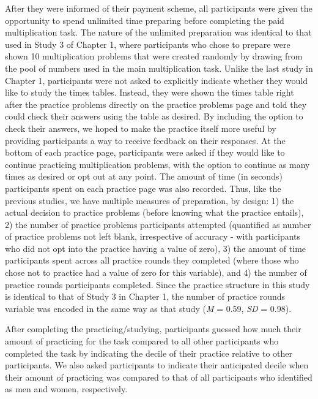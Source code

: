 \documentclass[letterpaper, nobind]{templates/ociamthesis}
\begin{document}
After they were informed of their payment scheme, all participants were given the opportunity to spend unlimited time preparing before completing the paid multiplication task. The nature of the unlimited preparation was identical to that used in Study 3 of Chapter 1, where participants who chose to prepare were shown 10 multiplication problems that were created randomly by drawing from the pool of numbers used in the main multiplication task. Unlike the last study in Chapter 1, participants were not asked to explicitly indicate whether they would like to study the times tables. Instead, they were shown the times table right after the practice problems directly on the practice problems page and told they could check their answers using the table as desired. By including the option to check their answers, we hoped to make the practice itself more useful by providing participants a way to receive feedback on their responses. At the bottom of each practice page, participants were asked if they would like to continue practicing multiplication problems, with the option to continue as many times as desired or opt out at any point. The amount of time (in seconds) participants spent on each practice page was also recorded. Thus, like the previous studies, we have multiple measures of preparation, by design: 1) the actual decision to practice problems (before knowing what the practice entails), 2) the number of practice problems participants attempted (quantified as number of practice problems not left blank, irrespective of accuracy - with participants who did not opt into the practice having a value of zero), 3) the amount of time participants spent across all practice rounds they completed (where those who chose not to practice had a value of zero for this variable), and 4) the number of practice rounds participants completed. Since the practice structure in this study is identical to that of Study 3 in Chapter 1, the number of practice rounds variable was encoded in the same way as that study (\emph{M} = 0.59, \emph{SD} = 0.98).

After completing the practicing/studying, participants guessed how much their amount of practicing for the task compared to all other participants who completed the task by indicating the decile of their practice relative to other participants. We also asked participants to indicate their anticipated decile when their amount of practicing was compared to that of all participants who identified as men and women, respectively.
\end{document}
